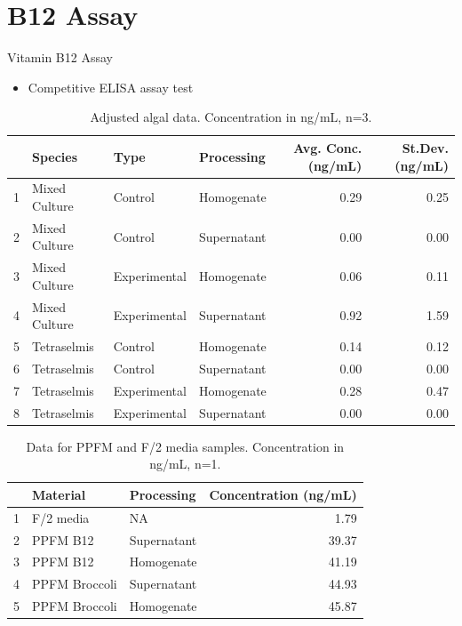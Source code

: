 \documentclass[8pt]{beamer}\usepackage[]{graphicx}\usepackage[]{color}
\begin{document}
\section{B12 Assay}
\begin{frame}{Vitamin B12 Assay}
\begin{itemize}
\item Competitive ELISA assay test
\end{itemize}
\begin{table}[H]
\centering
\small{
\begin{tabular}{rlllrr}
  \hline
 & Species & Type & Processing & Avg. Conc. (ng/mL) &  St.Dev. (ng/mL) \\ 
  \hline
1 & Mixed Culture & Control & Homogenate & 0.29 & 0.25 \\ 
  2 & Mixed Culture & Control & Supernatant & 0.00 & 0.00 \\ 
  3 & Mixed Culture & Experimental & Homogenate & 0.06 & 0.11 \\ 
  4 & Mixed Culture & Experimental & Supernatant & 0.92 & 1.59 \\ 
  5 & Tetraselmis & Control & Homogenate & 0.14 & 0.12 \\ 
  6 & Tetraselmis & Control & Supernatant & 0.00 & 0.00 \\ 
  7 & Tetraselmis & Experimental & Homogenate & 0.28 & 0.47 \\ 
  8 & Tetraselmis & Experimental & Supernatant & 0.00 & 0.00 \\ 
   \hline
\end{tabular}
}
\caption{Adjusted algal data. Concentration in ng/mL, n=3.} 
\label{tab:AdjustedDataTable1}
\end{table}
\begin{table}[H]
\centering
\begin{tabular}{rllr}
  \hline
 & Material & Processing & Concentration (ng/mL) \\ 
  \hline
1 & F/2 media & NA & 1.79 \\ 
  2 & PPFM B12 & Supernatant & 39.37 \\ 
  3 & PPFM B12 & Homogenate & 41.19 \\ 
  4 & PPFM Broccoli & Supernatant & 44.93 \\ 
  5 & PPFM Broccoli & Homogenate & 45.87 \\ 
   \hline
\end{tabular}
\caption{Data for PPFM and F/2 media samples. Concentration in ng/mL, n=1.} 
\label{tab:PPFMrevised}
\end{table}


\end{frame}
\end{document}
